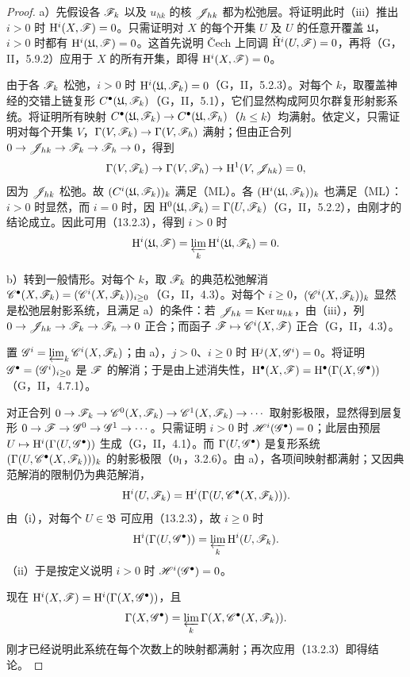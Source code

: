 \begin{proof}
a）先假设各 $\mathscr F_k$ 以及 $u_{hk}$ 的核 $\mathscr J_{hk}$ 都为松弛层。将证明此时（iii）推出 $i>0$ 时 $\mathrm H^i(X,\mathscr F)=0$。只需证明对 $X$ 的每个开集 $U$ 及 $U$ 的任意开覆盖 $\mathfrak U$，$i>0$ 时都有 $\mathrm H^i(\mathfrak U,\mathscr F)=0$。这首先说明 Čech 上同调 $\check{\mathrm H}^i(U,\mathscr F)=0$，再将（G，II，5.9.2）应用于 $X$ 的所有开集，即得 $\mathrm H^i(X,\mathscr F)=0$。

由于各 $\mathscr F_k$ 松弛，$i>0$ 时 $\mathrm H^i(\mathfrak U,\mathscr F_k)=0$（G，II，5.2.3）。对每个 $k$，取覆盖神经的交错上链复形 $C^\bullet(\mathfrak U,\mathscr F_k)$（G，II，5.1），它们显然构成阿贝尔群复形射影系统。将证明所有映射 $C^\bullet(\mathfrak U,\mathscr F_k)\to C^\bullet(\mathfrak U,\mathscr F_h)$（$h\leq k$）均满射。依定义，只需证明对每个开集 $V$，$\Gamma(V,\mathscr F_k)\to\Gamma(V,\mathscr F_h)$ 满射；但由正合列 $0\to\mathscr J_{hk}\to\mathscr F_k\to\mathscr F_h\to0$，得到
\[
\Gamma(V,\mathscr F_k)\to\Gamma(V,\mathscr F_h)\to\mathrm H^1(V,\mathscr J_{hk})=0,
\]
因为 $\mathscr J_{hk}$ 松弛。故 $(C^i(\mathfrak U,\mathscr F_k))_k$ 满足（ML）。各 $(\mathrm H^i(\mathfrak U,\mathscr F_k))_k$ 也满足（ML）：$i>0$ 时显然，而 $i=0$ 时，因 $\mathrm H^0(\mathfrak U,\mathscr F_k)=\Gamma(U,\mathscr F_k)$（G，II，5.2.2），由刚才的结论成立。因此可用（13.2.3），得到 $i>0$ 时
\[
\mathrm H^i(\mathfrak U,\mathscr F)=\varprojlim_k\mathrm H^i(\mathfrak U,\mathscr F_k)=0.
\]

b）转到一般情形。对每个 $k$，取 $\mathscr F_k$ 的典范松弛解消 $\mathscr C^\bullet(X,\mathscr F_k)=(\mathscr C^i(X,\mathscr F_k))_{i\geq0}$（G，II，4.3）。对每个 $i\geq0$，$(\mathscr C^i(X,\mathscr F_k))_k$ 显然是松弛层射影系统，且满足 a）的条件：若 $\mathscr J_{hk}=\operatorname{Ker} u_{hk}$，由（iii），列 $0\to\mathscr J_{hk}\to\mathscr F_k\to\mathscr F_h\to0$ 正合；而函子 $\mathscr F\mapsto\mathscr C^i(X,\mathscr F)$ 正合（G，II，4.3）。

置 $\mathscr G^i=\varprojlim_k\mathscr C^i(X,\mathscr F_k)$；由 a），$j>0$、$i\geq0$ 时 $\mathrm H^j(X,\mathscr G^i)=0$。将证明 $\mathscr G^\bullet=(\mathscr G^i)_{i\geq0}$ 是 $\mathscr F$ 的解消；于是由上述消失性，$\mathrm H^\bullet(X,\mathscr F)=\mathrm H^\bullet(\Gamma(X,\mathscr G^\bullet))$（G，II，4.7.1）。

对正合列 $0\to\mathscr F_k\to\mathscr C^0(X,\mathscr F_k)\to\mathscr C^1(X,\mathscr F_k)\to\cdots$ 取射影极限，显然得到层复形 $0\to\mathscr F\to\mathscr G^0\to\mathscr G^1\to\cdots$。只需证明 $i>0$ 时 $\mathscr H^i(\mathscr G^\bullet)=0$；此层由预层 $U\mapsto\mathrm H^i(\Gamma(U,\mathscr G^\bullet))$ 生成（G，II，4.1）。而 $\Gamma(U,\mathscr G^\bullet)$ 是复形系统 $(\Gamma(U,\mathscr C^\bullet(X,\mathscr F_k)))_k$ 的射影极限（$0_{\mathrm I}$，3.2.6）。由 a），各项间映射都满射；又因典范解消的限制仍为典范解消，
\[
\mathrm H^i(U,\mathscr F_k)=\mathrm H^i(\Gamma(U,\mathscr C^\bullet(X,\mathscr F_k))).
\]
由（i），对每个 $U\in\mathfrak B$ 可应用（13.2.3），故 $i\geq0$ 时
\[
\mathrm H^i(\Gamma(U,\mathscr G^\bullet))=\varprojlim_k\mathrm H^i(U,\mathscr F_k).
\]
（ii）于是按定义说明 $i>0$ 时 $\mathscr H^i(\mathscr G^\bullet)=0$。

现在 $\mathrm H^i(X,\mathscr F)=\mathrm H^i(\Gamma(X,\mathscr G^\bullet))$，且
\[
\Gamma(X,\mathscr G^\bullet)=\varprojlim_k\Gamma(X,\mathscr C^\bullet(X,\mathscr F_k)).
\]
刚才已经说明此系统在每个次数上的映射都满射；再次应用（13.2.3）即得结论。
\end{proof}

